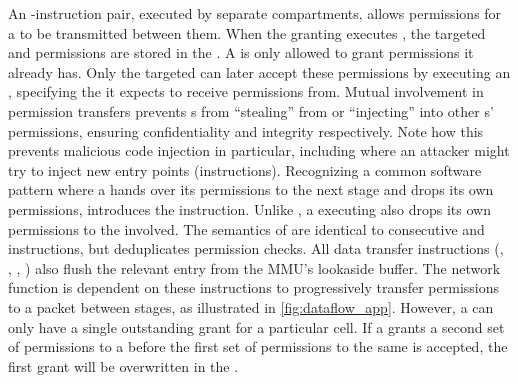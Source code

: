 An \scgrant-\screcv instruction pair, executed by
separate compartments, allows permissions for a \cell to be 
transmitted between them.
When the granting \secdiv executes \scgrant, the targeted
\sid and permissions are stored in the \gtable.
A \secdiv is only allowed to grant permissions it already has.
Only the targeted \secdiv can later accept these permissions
by executing an \screcv, specifying the \secdiv it expects to
receive permissions from.
Mutual involvement in permission transfers prevents \secdiv{}s
from ``stealing'' from or ``injecting'' into other \secdiv{}s'
permissions, ensuring confidentiality and integrity respectively.
Note how this prevents malicious code injection in particular,
including where an attacker might try to inject new entry 
points (\sdentry instructions).
Recognizing a common software pattern where a \secdiv hands over 
its permissions to the next stage and drops its own permissions, 
\seccells introduces the \sctfer instruction.
Unlike \scgrant, a \secdiv executing \sctfer also drops its
own permissions to the \cell involved.
The semantics of \sctfer are identical to consecutive \scgrant and 
\scprot instructions, but \sctfer deduplicates permission checks.
All data transfer instructions (\scprot, \scgrant, \sctfer, \screcv)
also flush the relevant entry from the MMU's lookaside buffer.
The network function is dependent on these instructions to
progressively transfer permissions to a packet between stages,
as illustrated in \autoref{fig:dataflow_app}.
However, a \secdiv can only have a single outstanding grant for
a particular cell. 
If a \secdiv grants a second set of permissions to a \cell before
the first set of permissions to the same \cell is accepted,
the first grant will be overwritten in the \gtable.

